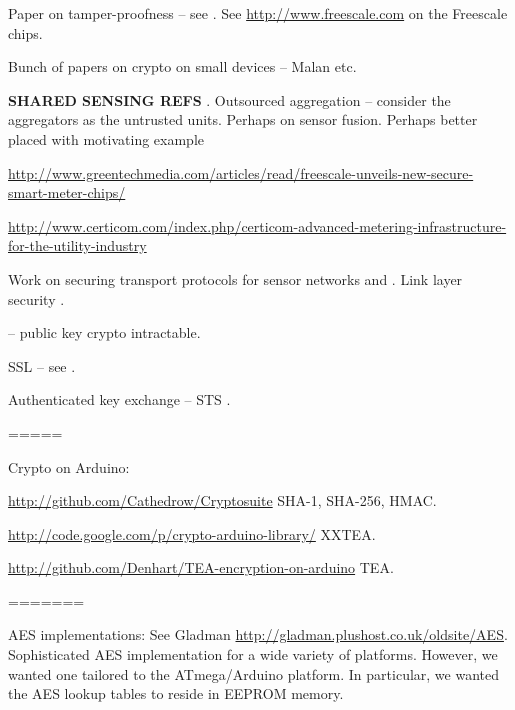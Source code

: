 Paper on tamper-proofness -- see \cite{anderson1996}. See \url{http://www.freescale.com} on the Freescale chips.

Bunch of papers on crypto on small devices -- Malan etc.

\textbf{SHARED SENSING REFS} \cite{grosky2007}. Outsourced aggregation \cite{nath2009} -- consider the aggregators as the untrusted units. Perhaps \cite{hammad2003} on sensor fusion. Perhaps better placed with motivating example

\url{http://www.greentechmedia.com/articles/read/freescale-unveils-new-secure-smart-meter-chips/}

\url{http://www.certicom.com/index.php/certicom-advanced-metering-infrastructure-for-the-utility-industry}

Work on securing transport protocols for sensor networks  and . Link layer security \cite{karlof2004}.

\cite{anderson2004} -- public key crypto intractable.

SSL -- see \cite{karlof2004}.

Authenticated key exchange -- STS \cite{diffie1992}.

=====

Crypto on Arduino:

\url{http://github.com/Cathedrow/Cryptosuite} SHA-1, SHA-256, HMAC.

\url{http://code.google.com/p/crypto-arduino-library/} XXTEA.

\url{http://github.com/Denhart/TEA-encryption-on-arduino} TEA.

=======

AES implementations: See Gladman \url{http://gladman.plushost.co.uk/oldsite/AES}. Sophisticated AES implementation for a wide variety of platforms. However, we wanted one tailored to the ATmega/Arduino platform. In particular, we wanted the AES lookup tables to reside in EEPROM memory.






